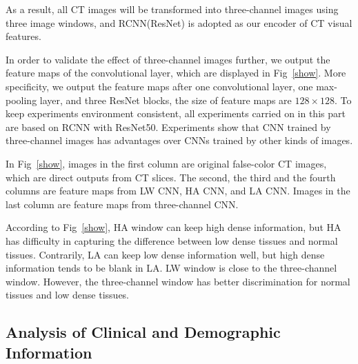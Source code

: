 \documentclass[journal]{IEEEtran}
\begin{document}
As a result, all CT images will be transformed into three-channel images using three image windows, and RCNN(ResNet) is adopted as our encoder of CT visual features.

In order to validate the effect of three-channel images further, we output the feature maps of the convolutional layer, which are displayed in Fig~\ref{show}. More specificity, we output the feature maps after one convolutional layer, one max-pooling layer, and three ResNet blocks, the size of feature maps are $128 \times 128$. To keep experiments environment consistent, all experiments carried on in this part are based on RCNN with ResNet50. Experiments show that CNN trained by three-channel images has advantages over CNNs trained by other kinds of images.

In Fig~\ref{show}, images in the first column are original false-color CT images, which are direct outputs from CT slices. The second, the third and the fourth columns are feature maps from LW CNN, HA CNN, and LA CNN. Images in the last column are feature maps from three-channel CNN.  

According to Fig~\ref{show}, HA window can keep high dense information, but HA has difficulty in capturing the difference between low dense tissues and normal tissues. Contrarily, LA can keep low dense information well, but high dense information tends to be blank in LA. LW window is close to the three-channel window. However, the three-channel window has better discrimination for normal tissues and low dense tissues.


\subsection{Analysis of Clinical and Demographic Information}
\label{complaintsagegender}
\end{document}
